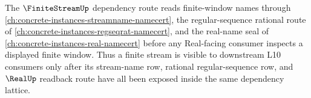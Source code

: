 The $\FiniteStreamUp$ dependency route reads finite-window names through \autoref{ch:concrete-instances-streamname-namecert}, the regular-sequence rational route of \autoref{ch:concrete-instances-regseqrat-namecert}, and the real-name seal of \autoref{ch:concrete-instances-real-namecert} before any Real-facing consumer inspects a displayed finite window. Thus a finite stream is visible to downstream L10 consumers only after its stream-name row, rational regular-sequence row, and $\RealUp$ readback route have all been exposed inside the same dependency lattice.
